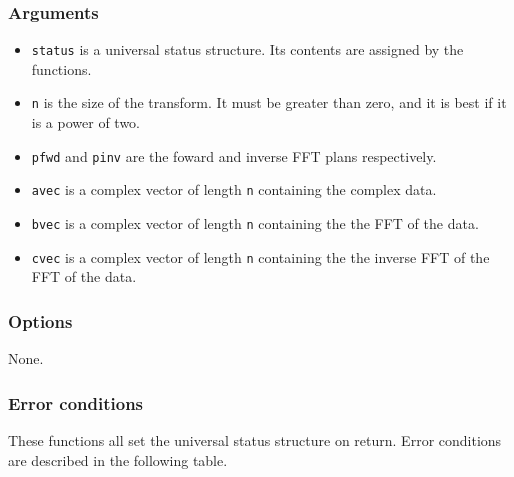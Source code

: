 \documentclass{article}
\begin{document}
\subsubsection{Arguments}


\begin{itemize}
\item \texttt{status} is a universal status structure.  Its contents are
assigned by the functions.
\item \texttt{n} is the size of the transform.  It
must be greater than zero, and it is best if it is a power of two.
\item \texttt{pfwd} and \texttt{pinv} are the foward and inverse FFT plans
respectively.
\item \texttt{avec} is a complex vector of length \texttt{n} containing the
complex data.
\item \texttt{bvec} is a complex vector of length \texttt{n} containing the
the FFT of the data.
\item \texttt{cvec} is a complex vector of length \texttt{n} containing the
the inverse FFT of the FFT of the data.
\end{itemize}

\subsubsection{Options}

None. 

\subsubsection{Error conditions}


These functions all set the universal status structure on return.
Error conditions are described in the following table.
\end{document}
